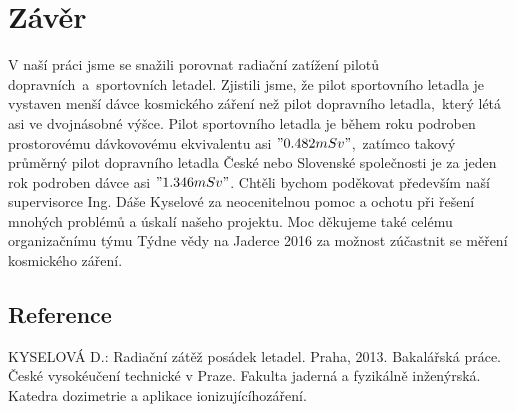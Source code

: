 \documentclass[12pt,a4paper]{article}
\begin{document}
\section*{Závěr}
V naší práci jsme se snažili porovnat radiační zatížení pilotů
dopravních~a~sportovních letadel. Zjistili jsme, že pilot sportovního letadla je
vystaven menší dávce kosmického záření než pilot dopravního letadla,~který létá
asi ve dvojnásobné výšce. Pilot sportovního letadla je během roku podroben
prostorovému dávkovovému ekvivalentu asi $"0.482 mSv" $,~zatímco takový průměrný
pilot dopravního letadla České nebo Slovenské společnosti je za jeden rok
podroben dávce asi $"1.346 mSv"$.
Chtěli bychom poděkovat především naší supervisorce Ing. Dáše Kyselové za
neocenitelnou pomoc a ochotu při řešení mnohých problémů a úskalí našeho
projektu. Moc děkujeme také celému organizačnímu týmu Týdne vědy na Jaderce
2016 za možnost zúčastnit se měření kosmického záření.
\subsection*{Reference}
\begin{thebibliography}{99}
KYSELOVÁ D.: Radiační zátěž posádek letadel. Praha, 2013. Bakalářská práce. České vysokéučení technické v Praze. Fakulta jaderná a fyzikálně inženýrská. Katedra dozimetrie a aplikace ionizujícíhozáření.
\end{thebibliography}
\end{document}
